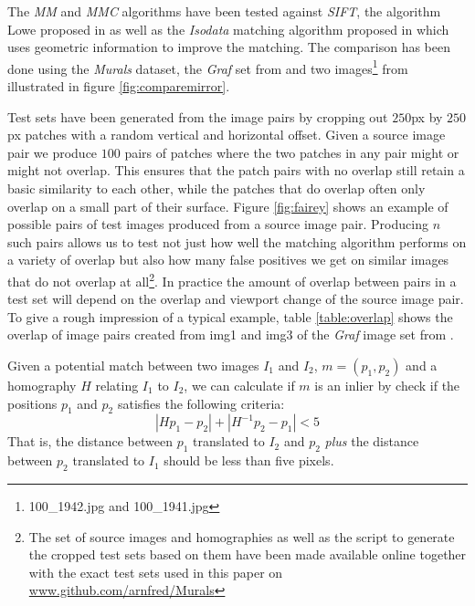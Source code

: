 \documentclass[conference]{IEEEtran}
\begin{document}
%
The \emph{MM} and \emph{MMC} algorithms have been tested against 
\emph{SIFT}, the algorithm Lowe proposed in \cite{lowe2004sift} as well 
as the \emph{Isodata} matching algorithm proposed in \cite{das2008event} 
which uses geometric information to improve the matching. The comparison 
has been done using the \emph{Murals} dataset, the \emph{Graf} set from 
\cite{mikolajczyk2005performance} and two images\footnote{100\_1942.jpg 
and 100\_1941.jpg} from \cite{gallagher2008} illustrated in figure 
\ref{fig:comparemirror}.

Test sets have been generated from the image pairs by cropping out 
$250$px by $250$px patches with a random vertical and horizontal offset.  
Given a source image pair we produce $100$ pairs of patches where the 
two patches in any pair might or might not overlap.  This ensures that 
the patch pairs with no overlap still retain a basic similarity to each 
other, while the patches that do overlap often only overlap on a small 
part of their surface. Figure \ref{fig:fairey} shows an example of 
possible pairs of test images produced from a source image pair.  
Producing $n$ such pairs allows us to test not just how well the 
matching algorithm performs on a variety of overlap but also how many 
false positives we get on similar images that do not overlap at 
all\footnote{The set of source images and homographies as well as the 
	script to generate the cropped test sets based on them have been 
	made available online together with the exact test sets used in this 
paper on 
\href{https://github.com/arnfred/Murals}{www.github.com/arnfred/Murals}}.  
In practice the amount of overlap between pairs in a test set will 
depend on the overlap and viewport change of the source image pair.  To 
give a rough impression of a typical example, table \ref{table:overlap} 
shows the overlap of image pairs created from img1 and img3 of the 
\emph{Graf} image set from \cite{mikolajczyk2005performance}.

Given a potential match between two images $I_1$ and $I_2$, $m = 
\left(p_1, p_2\right)$ and a homography $H$ relating $I_1$ to $I_2$, we 
can calculate if $m$ is an inlier by check if the positions $p_1$ and 
$p_2$ satisfies the following criteria:
$$\left\vert Hp_1 - p_2 \right\vert + \left\vert H^{-1}p_2 - p_1 
\right\vert < 5$$
That is, the distance between $p_1$ translated to $I_2$ and $p_2$ 
\emph{plus} the distance between $p_2$ translated to $I_1$ should be 
less than five pixels.
\end{document}
